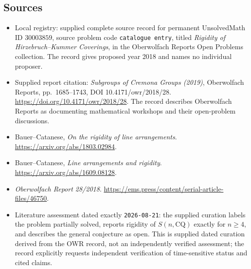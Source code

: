 \documentclass[11pt]{article}
\begin{document}
\subsection{Sources}
\begin{itemize}
\item Local registry: supplied complete source record for permanent UnsolvedMath ID \(30003859\), source problem code \texttt{catalogue entry}, titled \emph{Rigidity of Hirzebruch--Kummer Coverings}, in the Oberwolfach Reports Open Problems collection. The record gives proposed year 2018 and names no individual proposer.
\item Supplied report citation: \emph{Subgroups of Cremona Groups (2019)}, Oberwolfach Reports, pp.~1685--1743, DOI 10.4171/owr/2018/28. \url{https://doi.org/10.4171/owr/2018/28}. The record describes Oberwolfach Reports as documenting mathematical workshops and their open-problem discussions.
\item Bauer--Catanese, \emph{On the rigidity of line arrangements}. \url{https://arxiv.org/abs/1803.02984}.
\item Bauer--Catanese, \emph{Line arrangements and rigidity}. \url{https://arxiv.org/abs/1609.08128}.
\item \emph{Oberwolfach Report 28/2018}. \url{https://ems.press/content/serial-article-files/46750}.
\item Literature assessment dated exactly \texttt{2026-08-21}: the supplied curation labels the problem partially solved, reports rigidity of \(S(n,\mathrm{CQ})\) exactly for \(n\geq4\), and describes the general conjecture as open. This is supplied dated curation derived from the OWR record, not an independently verified assessment; the record explicitly requests independent verification of time-sensitive status and cited claims.
\end{itemize}
\end{document}
